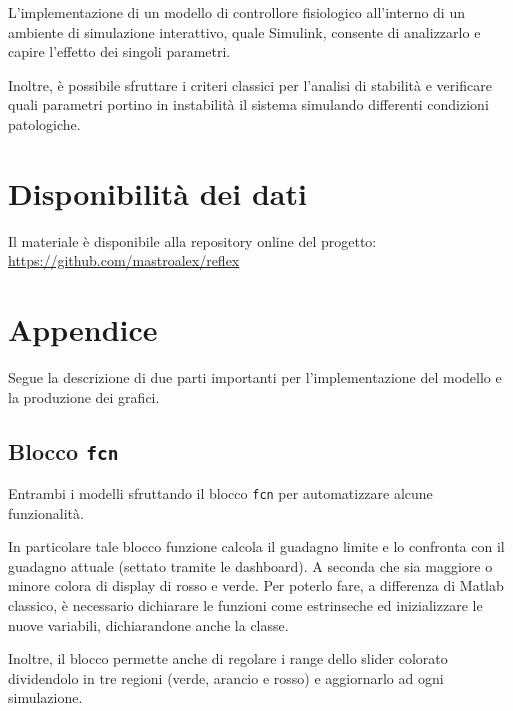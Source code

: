 L'implementazione di un modello di controllore fisiologico all'interno di un ambiente di simulazione interattivo, quale Simulink, consente di analizzarlo e capire l'effetto dei singoli parametri. 

Inoltre, è possibile sfruttare i criteri classici per l'analisi di stabilità e verificare quali parametri portino in instabilità il sistema simulando differenti condizioni patologiche. 

\raggedbottom
\section*{Disponibilità dei dati}

Il materiale è disponibile alla repository online del progetto: \url{https://github.com/mastroalex/reflex}


\raggedbottom
\printbibliography[title=Riferimenti]

\clearpage
\onecolumn
\section*{Appendice}

Segue la descrizione di due parti importanti per l'implementazione del modello e la produzione dei grafici.

\subsection{Blocco \texttt{fcn}}
\label{sec:fcn}

Entrambi i modelli sfruttando il blocco \texttt{fcn} per automatizzare alcune funzionalità. 

In particolare tale blocco funzione calcola il guadagno limite e lo confronta con il guadagno attuale (settato tramite le dashboard). A seconda che sia maggiore o minore colora di display di rosso e verde. Per poterlo fare, a differenza di Matlab classico, è necessario dichiarare le funzioni come estrinseche ed inizializzare le nuove variabili, dichiarandone anche la classe.

Inoltre, il blocco permette anche di regolare i range dello slider colorato dividendolo in tre regioni (verde, arancio e rosso) e aggiornarlo ad ogni simulazione.

